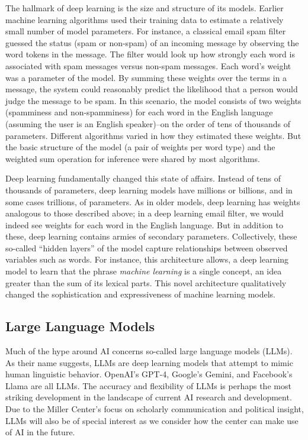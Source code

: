 \documentclass[12pt, oneside]{article}   	%
\begin{document}
The hallmark of deep learning is the size and structure of its models.  Earlier machine learning algorithms used their training data to estimate a relatively small number of model parameters.  For instance, a classical email spam filter guessed the status (spam or non-spam) of an incoming message by observing the word tokens in the message.  The filter would look up how strongly each word is associated with spam messages versus non-spam messages.  Each word's weight was a parameter of the model. By summing these weights over the terms in a message, the system could reasonably predict the likelihood that a person would judge the message to be spam.  In this scenario, the model consists of two weights (spamminess and non-spamminess) for each word in the English language (assuming the user is an English speaker)--on the order of tens of thousands of parameters.  Different algorithms varied in how they estimated these weights.  But the basic structure of the model (a pair of weights per word type) and the weighted sum operation for inference  were shared by most algorithms.

Deep learning fundamentally changed this state of affairs.  Instead of tens of thousands of parameters, deep learning models have millions or billions, and in some cases trillions, of parameters.  As in older models, deep learning has weights analogous to those described above; in a deep learning email filter, we would indeed see weights for each word in the English language.  But in addition to these, deep learning contains armies of secondary parameters.  Collectively, these so-called “hidden layers” of the model capture relationships between observed variables such as words.  For instance, this architecture allows, a deep learning model to learn that the phrase \emph{machine learning} is a single concept, an idea greater than the sum of its lexical parts.  This novel architecture qualitatively changed the sophistication and expressiveness of machine learning models.



\subsection{Large Language Models}\label{section.definitions.llms}
Much of the hype around AI concerns so-called large language models (LLMs).  As their name suggests, LLMs are deep learning models that attempt to mimic human linguistic behavior.  OpenAI’s GPT-4, Google’s Gemini, and Facebook’s Llama are all LLMs.  The accuracy and flexibility of LLMs is perhaps the most striking development in the landscape of current AI research and development.  Due to the Miller Center’s focus on scholarly communication and political insight, LLMs will also be of special interest as we consider how the center can make use of AI in the future.
\end{document}
